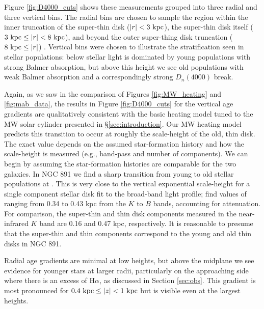 Figure \ref{fig:D4000_cuts} shows these measurements grouped into
three radial and three vertical bins. The radial bins are chosen to
sample the region within the inner truncation of the super-thin disk
($|r| < 3~\mathrm{kpc} $), the super-thin disk itself ($3~\mathrm{kpc} \leq
|r| < 8~\mathrm{kpc} $), and beyond the outer super-thing disk truncation
($8~\mathrm{kpc}  \leq |r|$) \citep{Schechtman-Rook13}. Vertical bins
were chosen to illustrate the stratification seen in stellar
populations: below  stellar light is dominated by young
populations with strong Balmer absorption, but above this height we
see old populations with weak Balmer absorption and a correspondingly
strong $D_n(4000)$ break.

Again, as we saw in the comparison of Figures \ref{fig:MW_heating} and
\ref{fig:mab_data}, the results in Figure \ref{fig:D4000_cuts} for
the vertical age gradients are qualitatively consistent with the basic
heating model tuned to the MW solar cylinder presented in
\S\ref{sec:introduction}. Our MW heating model predicts this
transition to occur at roughly the scale-height of the old, thin
disk. The exact value depends on the assumed star-formation history
and how the scale-height is measured (e.g., band-pass and number of
components). We can begin by assuming the star-formation histories are
comparable for the two galaxies. In NGC 891 we find a sharp transition
from young to old stellar populations at . This is very
close to the vertical exponential scale-height for a single component
stellar disk fit to the broad-band light profile; \citet{Xilouris99}
find values of ranging from 0.34 to 0.43 kpc from the $K$ to $B$
bands, accounting for attenuation. For comparison, the super-thin and
thin disk components measured in the near-infrared $K$ band are 0.16
and 0.47 kpc, respectively. It is reasonable to presume that the
super-thin and thin components correspond to the young and old thin
disks in NGC 891.

Radial age gradients are minimal at low heights, but above the
midplane we see evidence for younger stars at larger radii,
particularly on the approaching side where there is an excess of
H$\alpha$, as discussed in Section \ref{sec:obs}. This gradient is
most pronounced for $0.4~\mathrm{kpc}  \leq |z| < 1~\mathrm{kpc} $ but is
visible even at the largest heights.

